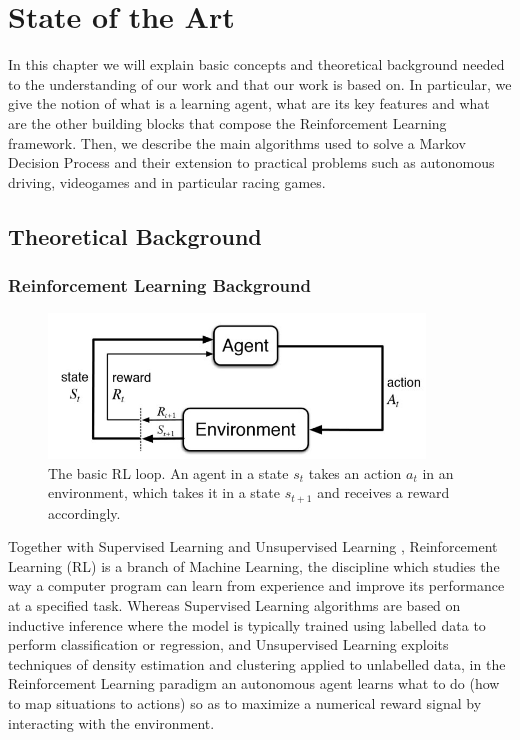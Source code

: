 \chapter{State of the Art}
\label{State of the Art}
\thispagestyle{empty}


In this chapter we will explain basic concepts and theoretical background needed to the understanding of our work and that our work is based on. In particular, we give the notion of what is a learning agent, what are its key features and what are the other building blocks that compose the Reinforcement Learning framework. Then, we describe the main algorithms used to solve a Markov Decision Process and their extension to practical problems such as autonomous driving, videogames and in particular racing games.

\section{Theoretical Background}

\subsection{Reinforcement Learning Background}
\begin{figure}[t]
 \centering
  \captionsetup{width=10cm}
  \includegraphics[width=10cm]{./img/rl}
  \caption{The basic RL loop. An agent in a state $s_t$ takes an action $a_t$ in an environment, which takes it in a state $s_{t+1}$ and receives a reward accordingly.}
   \label{fig:rl-loop}
\end{figure}
Together with Supervised Learning and Unsupervised Learning \cite{elements}, Reinforcement Learning (RL) is a branch of Machine Learning, the discipline which studies the way a computer program can learn from experience and improve its performance at a specified task. Whereas Supervised Learning algorithms are based on inductive inference where the model is typically trained using labelled data to perform classification or regression, and Unsupervised Learning exploits techniques of density estimation and clustering applied to unlabelled data, in the Reinforcement Learning paradigm an autonomous agent learns what to do (how to map situations to actions) so as to maximize a numerical reward signal by interacting with the environment.

